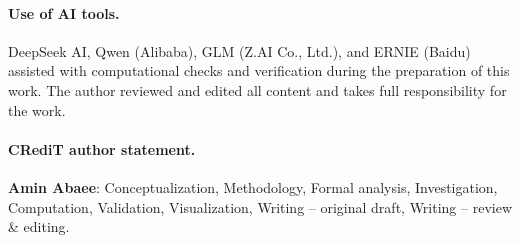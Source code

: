 \documentclass[11pt,a4paper]{article}
\numberwithin{equation}{section}
\theoremstyle{plain}
\begin{document}
\paragraph{Use of AI tools.} DeepSeek AI, Qwen (Alibaba), GLM (Z.AI Co.,
Ltd.), and ERNIE (Baidu) assisted with computational checks and
verification during the preparation of this work. The author reviewed and
edited all content and takes full responsibility for the work.

\paragraph{CRediT author statement.} \textbf{Amin Abaee}: Conceptualization,
Methodology, Formal analysis, Investigation, Computation, Validation,
Visualization, Writing -- original draft, Writing -- review \& editing.
\end{document}
